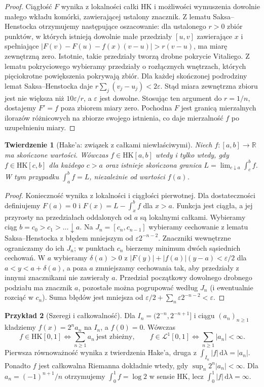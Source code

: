 \documentclass[11pt,a4paper]{article}
\numberwithin{equation}{section}
\theoremstyle{plain}
\newtheorem{twierdzenie}{Twierdzenie}[section]
\theoremstyle{definition}
\newtheorem{przyklad}[twierdzenie]{Przykład}
\theoremstyle{remark}
\newcommand{\R}{\mathbb R}
\newcommand{\HK}{\mathrm{HK}}
\begin{document}
\begin{proof}
Ciągłość $F$ wynika z lokalności całki HK i możliwości wymuszenia dowolnie małego wkładu komórki, zawierającej ustalony znacznik. Z lematu Saksa--Henstocka otrzymujemy następujące oszacowanie: dla ustalonego $r>0$ zbiór punktów, w których istnieją dowolnie małe przedziały $[u,v]$ zawierające $x$ i spełniające $|F(v)-F(u)-f(x)(v-u)|>r(v-u)$, ma miarę zewnętrzną zero. Istotnie, takie przedziały tworzą drobne pokrycie Vitaliego. Z lematu pokryciowego wybieramy przedziały o rozłącznych wnętrzach, których pięciokrotne powiększenia pokrywają zbiór. Dla każdej skończonej podrodziny lemat Saksa--Henstocka daje $r\sum_j(v_j-u_j)<2\varepsilon$. Stąd miara zewnętrzna zbioru jest nie większa niż $10\varepsilon/r$, a $\varepsilon$ jest dowolne. Stosując ten argument do $r=1/n$, dostajemy $F'=f$ poza zbiorem miary zero. Pochodna $F$ jest granicą mierzalnych ilorazów różnicowych na zbiorze swojego istnienia, co daje mierzalność $f$ po uzupełnieniu miary.
\end{proof}
\begin{twierdzenie}[Hake'a: związek z całkami niewłaściwymi]
Niech $f:[a,b]\to\R$ ma skończone wartości. Wówczas $f\in\HK[a,b]$ wtedy i tylko wtedy, gdy $f\in\HK[c,b]$ dla każdego $c>a$ oraz istnieje skończona granica $L=\lim_{c\downarrow a}\int_c^b f$. W tym przypadku $\int_a^b f=L$, niezależnie od wartości $f(a)$.
\end{twierdzenie}
\begin{proof}
Konieczność wynika z lokalności i ciągłości pierwotnej. Dla dostateczności definiujemy $F(a)=0$ i $F(x)=L-\int_x^b f$ dla $x>a$. Funkcja jest ciągła, a jej przyrosty na przedziałach oddalonych od $a$ są lokalnymi całkami. Wybieramy ciąg $b=c_0>c_1>\dots\downarrow a$. Na $J_n=[c_n,c_{n-1}]$ wybieramy cechowanie z lematu Saksa--Henstocka z błędem mniejszym od $\varepsilon2^{-n-2}$. Znaczniki wewnętrzne ograniczamy do ich $J_n$; w punktach $c_n$ bierzemy minimum dwóch sąsiednich cechowań. W $a$ wybieramy $\delta(a)>0$ z $|F(y)|+|f(a)|(y-a)<\varepsilon/2$ dla $a<y<a+\delta(a)$, a poza $a$ zmniejszamy cechowania tak, aby przedziały z innymi znacznikami nie zawierały $a$. Przedział początkowy dowolnego drobnego podziału ma znacznik $a$, pozostałe można pogrupować według $J_n$ (i ewentualnie rozciąć w $c_n$). Suma błędów jest mniejsza od $\varepsilon/2+\sum_n\varepsilon2^{-n-2}<\varepsilon$.
\end{proof}
\begin{przyklad}[Szeregi i całkowalność]
Dla $I_n=(2^{-n},2^{-n+1}]$ i ciągu $(a_n)_{n\ge1}$ kładziemy $f(x)=2^n a_n$ na $I_n$, a $f(0)=0$. Wówczas
\[
f\in\HK[0,1]\iff\sum_{n\ge1}a_n\ \text{jest zbieżny},\qquad
f\in\mathcal L^1[0,1]\iff\sum_{n\ge1}|a_n|<\infty.
\]
Pierwsza równoważność wynika z twierdzenia Hake'a, druga z $\int_{I_n}|f|\,\mathrm d\lambda=|a_n|$. Ponadto $f$ jest całkowalna Riemanna dokładnie wtedy, gdy $\sup_n2^n|a_n|<\infty$. Dla $a_n=(-1)^{n+1}/n$ otrzymujemy $\int_0^1f=\log2$ w sensie HK, lecz $\int_0^1|f|\,\mathrm d\lambda=\infty$.
\end{przyklad}
\end{document}
